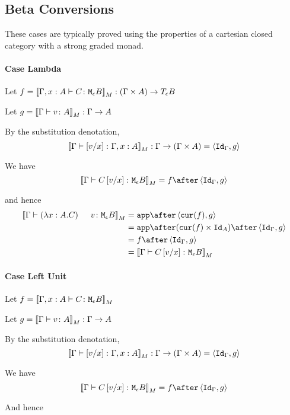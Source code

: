 \documentclass{report}
\begin{document}
    \subsection{Beta Conversions}
    These cases are typically proved using the properties of a cartesian closed category with a strong graded monad.

    \paragraph{Case Lambda}
        Let $f = \deno{\typerelation{\gax}{C}{\meb}}: (\G \times A) \rightarrow\teb$

        Let $g = \deno{\gtyperelation{v}{A}}: \G \rightarrow A$

        By the substitution denotation, $$\deno{\typerelation{\G}{\ssub{x}{v}}{\gax}}: \G \rightarrow (\G \times A) = \pr{\idg}{g}$$

        We have $$\deno{\gtyperelation{C\ssub{x}{v}}{\meb}} = f \after \pr{\idg}{g}$$

        and hence
        \begin{equation}
            \begin{split}
                \deno{\gtyperelation{\apply{(\lam{x}{A}{C})}{v}}{\meb}} & = \app\after\pr{\cur{f}}{g} \\
                & = \app\after(\cur{f}\times\Id{A})\after\pr{\idg}{g}\\
                & = f \after \pr{\idg}{g} \\
                & = \deno{\gtyperelation{C\ssub{x}{v}}{\meb}}  
            \end{split}
        \end{equation}
       

    \paragraph{Case Left Unit}
    Let $f = \deno{\typerelation{\gax}{C}{\meb}}$

    Let $g = \deno{\gtyperelation{v}{A}}: \G \rightarrow A$

    By the substitution denotation, $$\deno{\typerelation{\G}{\ssub{x}{v}}{\gax}}: \G \rightarrow (\G \times A) = \pr{\idg}{g}$$

    We have $$\deno{\gtyperelation{C\ssub{x}{v}}{\meb}} = f \after \pr{\idg}{g}$$

    And hence
\end{document}
